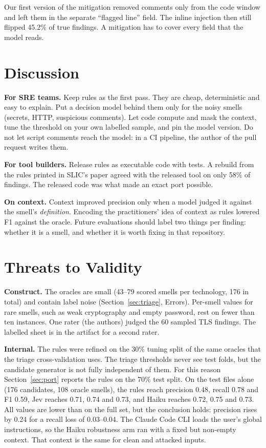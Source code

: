 \documentclass[conference]{IEEEtran}
\begin{document}
Our first version of the mitigation removed comments only from the code window and left them in the separate
``flagged line'' field. The inline injection then still flipped 45.2\% of true findings. A mitigation has to cover
every field that the model reads.

\section{Discussion}
\textbf{For SRE teams.} Keep rules as the first pass. They are cheap, deterministic and easy to explain. Put a decision
model behind them only for the noisy smells (secrets, HTTP, suspicious comments). Let code compute and mask the
context, tune the threshold on your own labelled sample, and pin the model version. Do not let script comments reach
the model: in a CI pipeline, the author of the pull request writes them.

\textbf{For tool builders.} Release rules as executable code with tests. A rebuild from the rules printed in SLIC's
paper agreed with the released tool on only 58\% of findings. The released code was what made an exact port possible.

\textbf{On context.} Context improved precision only when a model judged it against the smell's \emph{definition}.
Encoding the practitioners' idea of context as rules lowered F1 against the oracle. Future evaluations should label
two things per finding: whether it is a smell, and whether it is worth fixing in that repository.

\section{Threats to Validity}
\textbf{Construct.} The oracles are small (43--79 scored smells per technology, 176 in total) and contain label noise
(Section~\ref{sec:triage}, Errors). Per-smell values for rare smells, such as weak cryptography and empty password, rest
on fewer than ten instances. One rater (the authors) judged the 60 sampled TLS findings. The labelled sheet is in the
artifact for a second rater.

\textbf{Internal.} The rules were refined on the 30\% tuning split of the same oracles that the triage
cross-validation uses. The triage thresholds never see test folds, but the candidate generator is not fully
independent of them. For this reason Section~\ref{sec:port} reports the rules on the 70\% test split. On the test files
alone (176 candidates, 108 oracle smells), the rules reach precision 0.48, recall 0.78 and F1 0.59, Jev reaches 0.71,
0.74 and 0.73, and Haiku reaches 0.72, 0.75 and 0.73. All values are lower than on the full set, but the conclusion
holds: precision rises by 0.24 for a recall loss of 0.03--0.04. The Claude Code CLI
loads the user's global instructions, so the Haiku robustness arm ran with a fixed but non-empty context. That context
is the same for clean and attacked inputs.
\end{document}
